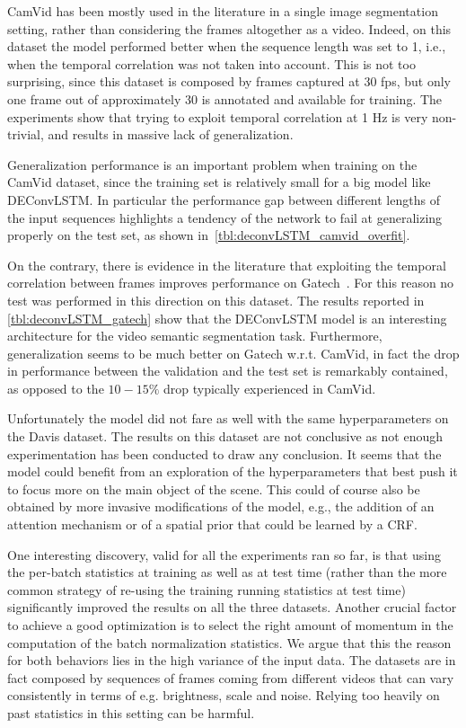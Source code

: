 CamVid has been mostly used in the literature in a single image
segmentation setting, rather than considering the frames altogether as a video.
Indeed, on this dataset the model performed better when the sequence length was
set to 1, i.e., when the temporal correlation was not taken into account.
This is not too surprising, since this dataset is composed by frames captured
at 30 fps, but only one frame out of approximately 30 is annotated and available
for training. The experiments show that trying to exploit temporal correlation
at 1 Hz is very non-trivial, and results in massive lack of generalization.

Generalization performance is an important problem when training on the CamVid
dataset, since the training set is relatively small for a big model like
DEConvLSTM. In particular the performance gap between different lengths of the
input sequences highlights a tendency of the network to fail at generalizing
properly on the test set, as shown in~\autoref{tbl:deconvLSTM_camvid_overfit}.

On the contrary, there is evidence in the literature that exploiting the
temporal correlation between frames improves performance on Gatech~\citep{
Tran16v2v}. For this reason no test was performed in this direction on this
dataset. The results reported in \autoref{tbl:deconvLSTM_gatech} show that
the DEConvLSTM model is an interesting architecture for the video semantic
segmentation task. Furthermore, generalization seems to be much better on
Gatech w.r.t. CamVid, in fact the drop in performance between the validation
and the test set is remarkably contained, as opposed to the $10-15\%$ drop
typically experienced in CamVid.

Unfortunately the model did not fare as well with the same hyperparameters on
the Davis dataset. The results on this dataset are not conclusive as not enough
experimentation has been conducted to draw any conclusion. It seems that the
model could benefit from an exploration of the hyperparameters that best push
it to focus more on the main object of the scene. This could of course also be
obtained by more invasive modifications of the model, e.g., the addition of an
attention mechanism or of a spatial prior that could be learned by a CRF.

One interesting discovery, valid for all the experiments ran so far, is
that using the per-batch statistics at training as well as at test time (rather
than the more common strategy of re-using the training running statistics at
test time) significantly improved the results on all the three datasets.
Another crucial factor to achieve a good optimization is to select the right
amount of momentum in the computation of the batch normalization statistics. We
argue that this the reason for both behaviors lies in the high variance of the
input data. The datasets are in fact composed by sequences of frames coming
from different videos that can vary consistently in terms of e.g. brightness,
scale and noise. Relying too heavily on past statistics in this setting can be
harmful.

